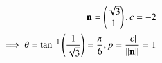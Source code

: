		\begin{align}
	\mathbf{n}=\begin{pmatrix}\sqrt{3}\\1\end{pmatrix},
			c=-2
			\\
			\implies
			\theta=\tan^{-1}\left(\frac{1}{\sqrt{3}}\right)
			=\frac{\pi}{6},
			p=\frac{\left\vert c\right\vert}{\left\lVert\mathbf{n}\right\rVert}=1
		\end{align}

